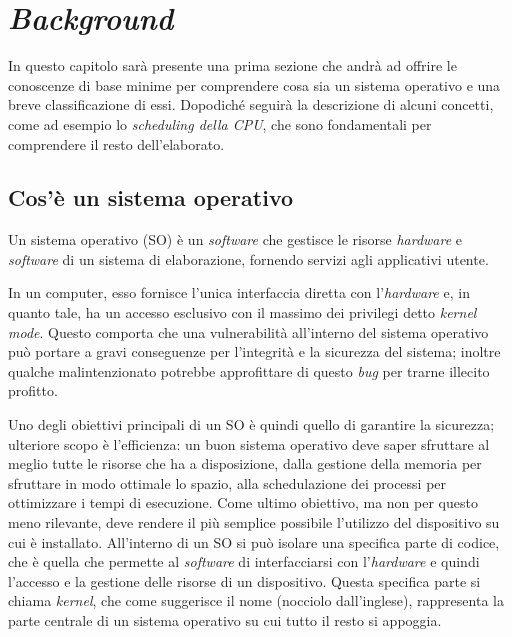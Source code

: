 \chapter{\textit{Background}}
In questo capitolo sarà presente una prima sezione che andrà ad offrire le conoscenze di base minime per comprendere cosa sia un sistema operativo e una breve classificazione di essi. Dopodiché seguirà la descrizione di alcuni concetti, come ad esempio lo \textit{scheduling della CPU}, che sono fondamentali per comprendere il resto dell'elaborato.

\section{Cos'è un sistema operativo}
Un sistema operativo (SO) è un \textit{software} che gestisce le risorse \textit{hardware} e \textit{software} di un sistema di elaborazione, fornendo servizi agli applicativi utente.

In un computer, esso fornisce l'unica interfaccia diretta con l'\textit{hardware} e, in quanto tale, ha un accesso esclusivo con il massimo dei privilegi detto \textit{kernel mode}. Questo comporta che una vulnerabilità all'interno del sistema operativo può portare a gravi conseguenze per l'integrità e la sicurezza del sistema; inoltre qualche malintenzionato potrebbe approfittare di questo \textit{bug} per trarne illecito profitto.

Uno degli obiettivi principali di un SO è quindi quello di garantire la sicurezza; ulteriore scopo è l'efficienza: un buon sistema operativo deve saper sfruttare al meglio tutte le risorse che ha a disposizione, dalla gestione della memoria per sfruttare in modo ottimale lo spazio, alla schedulazione dei processi per ottimizzare i tempi di esecuzione. Come ultimo obiettivo, ma non per questo meno rilevante, deve rendere il più semplice possibile l'utilizzo del dispositivo su cui è installato.
All'interno di un SO si può isolare una specifica parte di codice, che è quella che permette al \textit{software} di interfacciarsi con l'\textit{hardware} e quindi l'accesso e la gestione delle risorse di un dispositivo. Questa specifica parte si chiama \textit{kernel}, che come suggerisce il nome (nocciolo dall'inglese), rappresenta la parte centrale di un sistema operativo su cui tutto il resto si appoggia.
\newpage


